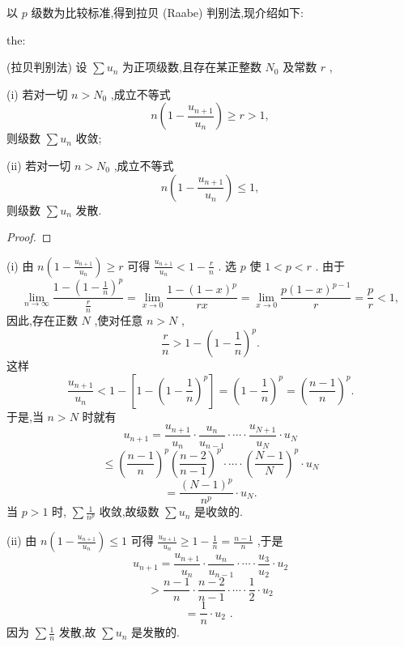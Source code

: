 以 \(p\) 级数为比较标准,得到拉贝 (Raabe) 判别法,现介绍如下:

\begin{theorem}{}{the:}

\end{theorem}
 (拉贝判别法) 设 \(\sum {u}_{n}\) 为正项级数,且存在某正整数 \({N}_{0}\) 及常数 \(r\) ,

(i) 若对一切 \(n > {N}_{0}\) ,成立不等式
\[
n\left( {1 - \frac{{u}_{n + 1}}{{u}_{n}}}\right)  \geq  r > 1,
\]
则级数 \(\sum {u}_{n}\) 收敛;

(ii) 若对一切 \(n > {N}_{0}\) ,成立不等式
\[
n\left( {1 - \frac{{u}_{n + 1}}{{u}_{n}}}\right)  \leq  1,
\]
则级数 \(\sum {u}_{n}\) 发散.

\begin{proof}

\end{proof}
(i) 由 \(n\left( {1 - \frac{{u}_{n + 1}}{{u}_{n}}}\right)  \geq  r\) 可得 \(\frac{{u}_{n + 1}}{{u}_{n}} < 1 - \frac{r}{n}\) . 选 \(p\) 使 \(1 < p < r\) . 由于
\[
\mathop{\lim }\limits_{{n \rightarrow  \infty }}\frac{1 - {\left( 1 - \frac{1}{n}\right) }^{p}}{\frac{r}{n}} = \mathop{\lim }\limits_{{x \rightarrow  0}}\frac{1 - {\left( 1 - x\right) }^{p}}{rx} = \mathop{\lim }\limits_{{x \rightarrow  0}}\frac{p{\left( 1 - x\right) }^{p - 1}}{r} = \frac{p}{r} < 1,
\]
因此,存在正数 \(N\) ,使对任意 \(n > N\) ,
\[
\frac{r}{n} > 1 - {\left( 1 - \frac{1}{n}\right) }^{p}.
\]
这样
\[
\frac{{u}_{n + 1}}{{u}_{n}} < 1 - \left\lbrack  {1 - {\left( 1 - \frac{1}{n}\right) }^{p}}\right\rbrack   = {\left( 1 - \frac{1}{n}\right) }^{p} = {\left( \frac{n - 1}{n}\right) }^{p}.
\]
于是,当 \(n > N\) 时就有
\[
{u}_{n + 1} = \frac{{u}_{n + 1}}{{u}_{n}} \cdot  \frac{{u}_{n}}{{u}_{n - 1}} \cdot  \cdots  \cdot  \frac{{u}_{N + 1}}{{u}_{N}} \cdot  {u}_{N}
\]
\[
\leq  {\left( \frac{n - 1}{n}\right) }^{p}{\left( \frac{n - 2}{n - 1}\right) }^{p} \cdot  \cdots  \cdot  {\left( \frac{N - 1}{N}\right) }^{p} \cdot  {u}_{N}
\]
\[
= \frac{{\left( N - 1\right) }^{p}}{{n}^{p}} \cdot  {u}_{N}.
\]
当 \(p > 1\) 时, \(\sum \frac{1}{{n}^{p}}\) 收敛,故级数 \(\sum {u}_{n}\) 是收敛的.

(ii) 由 \(n\left( {1 - \frac{{u}_{n + 1}}{{u}_{n}}}\right)  \leq  1\) 可得 \(\frac{{u}_{n + 1}}{{u}_{n}} \geq  1 - \frac{1}{n} = \frac{n - 1}{n}\) ,于是
\[
{u}_{n + 1} = \frac{{u}_{n + 1}}{{u}_{n}} \cdot  \frac{{u}_{n}}{{u}_{n - 1}} \cdot  \cdots  \cdot  \frac{{u}_{3}}{{u}_{2}} \cdot  {u}_{2}
\]
\[
> \frac{n - 1}{n} \cdot  \frac{n - 2}{n - 1} \cdot  \cdots  \cdot  \frac{1}{2} \cdot  {u}_{2}
\]
\[
= \frac{1}{n} \cdot  {u}_{2}\text{ . }
\]
因为 \(\sum \frac{1}{n}\) 发散,故 \(\sum {u}_{n}\) 是发散的.

